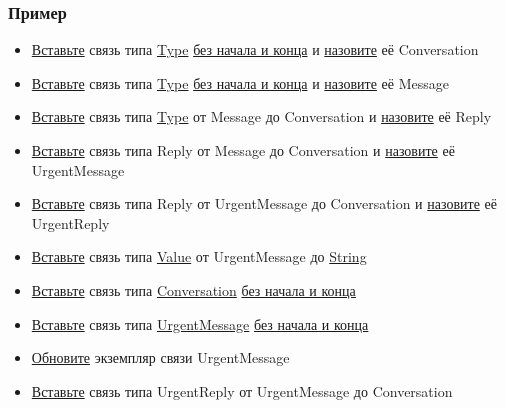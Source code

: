 \documentclass{article}
\begin{document}
\subsubsection{Пример}
\begin{itemize}
  \item \hyperlink{DeepCase.InsertLink.Description}{Вставьте} связь типа
        \hyperlink{Core.Type.Description}{Type} \hyperlink{FAQ.HowToInsertLinkWithoutFromAndTo}{без
          начала и конца} и \hyperlink{FAQ.HowToSetName}{назовите} её Conversation
  \item \hyperlink{DeepCase.InsertLink.Description}{Вставьте} связь типа
        \hyperlink{Core.Type.Description}{Type} \hyperlink{FAQ.HowToInsertLinkWithoutFromAndTo}{без
          начала и конца} и
        \hyperlink{FAQ.HowToSetName}{назовите} её Message
  \item \hyperlink{DeepCase.InsertLink.Description}{Вставьте} связь типа
        \hyperlink{Core.Type.Description}{Type} от Message до Conversation и
        \hyperlink{FAQ.HowToSetName}{назовите} её Reply
  \item \hyperlink{DeepCase.InsertLink.Description}{Вставьте} связь типа Reply от
        Message до Conversation и \hyperlink{FAQ.HowToSetName}{назовите} её
        UrgentMessage
  \item \hyperlink{DeepCase.InsertLink.Description}{Вставьте} связь типа Reply от
        UrgentMessage до Conversation и \hyperlink{FAQ.HowToSetName}{назовите} её
        UrgentReply
  \item \hyperlink{DeepCase.InsertLink.Description}{Вставьте} связь типа
        \hyperlink{Core.Value.Description}{Value} от UrgentMessage до
        \hyperlink{Core.String.Description}{String}
  \item \hyperlink{DeepCase.InsertLink.Description}{Вставьте} связь типа
        \hyperlink{Core.Type.Description}{Conversation}
        \hyperlink{FAQ.HowToInsertLinkWithoutFromAndTo}{без начала и конца}
  \item \hyperlink{DeepCase.InsertLink.Description}{Вставьте} связь типа
        \hyperlink{Core.Type.Description}{UrgentMessage}
        \hyperlink{FAQ.HowToInsertLinkWithoutFromAndTo}{без начала и конца}
  \item \hyperlink{DeepCase.UpdateLink.Description}{Обновите} экземпляр связи
        UrgentMessage
  \item \hyperlink{DeepCase.InsertLink.Description}{Вставьте} связь типа UrgentReply от
        UrgentMessage до Conversation
\end{itemize}
\end{document}

